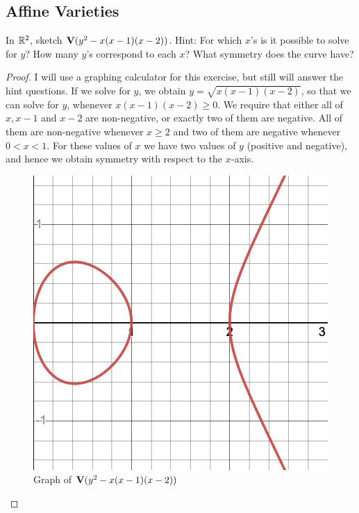 \subsection{Affine Varieties}


\begin{exercise}{2}
In $\mathbb{R}^2$, sketch $\mathbf{V}(y^2-x(x-1)(x-2))$. Hint: For which $x$'s is it possible to solve for $y$? How many $y$'s correspond to each $x$? What symmetry does the curve have?
\end{exercise}
\begin{proof}
I will use a graphing calculator for this exercise, but still will answer the hint questions. If we solve for $y$, we obtain $y=\sqrt{x(x-1)(x-2)}$, so that we can solve for $y$, whenever $x(x-1)(x-2)\geq 0$. We require that either all of $x, x-1$ and $x-2$ are non-negative, or exactly two of them are negative. All of them are non-negative whenever $x\geq 2$ and two of them are negative whenever $0<x<1$. For these values of $x$ we have two values of $y$ (positive and negative), and hence we obtain symmetry with respect to the $x$-axis.
 \begin{figure}[H]
     \centering
     \includegraphics[width=.5\textwidth]{cox-little-oshea/assets/sec1-2-ex2.png}
     \caption{Graph of $\mathbf{V}(y^2-x(x-1)(x-2))$}
     \label{fig:sec1-2-ex2}
 \end{figure}
\end{proof}

